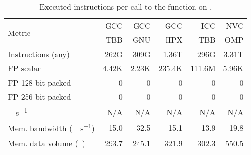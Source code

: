 \begin{table}[t]
	\centering
	\caption{Executed instructions per call to the function \groupsort on \machhydralong.}
	\label{tab:reduce-hw-counters}
	\begin{adjustbox}{max width=\linewidth}
	\begin{tabular}{lrrrrr}
		\toprule
		\multirow{2}{*}{Metric}                       & GCC   & GCC   & GCC    & ICC    & NVC   \\
		                                              & TBB   & GNU   & HPX    & TBB    & OMP   \\
		\midrule
		Instructions (any)                            & 262G  & 309G  & 1.36T  & 296G   & 3.31T \\
		FP scalar                                     & 4.42K & 2.23K & 235.4K & 111.6M & 5.96K \\
		FP 128-bit packed                             & 0     & 0     & 0      & 0      & 0     \\
		FP 256-bit packed                             & 0     & 0     & 0      & 0      & 0     \\
		\unit{\giga\FLOP\per\second}                  & N/A   & N/A   & N/A    & N/A    & N/A   \\
		Mem. bandwidth (\unit{\gibi\byte\per\second}) & 15.0  & 32.5  & 15.1   & 13.9   & 19.8  \\
		Mem. data volume (\unit{\gibi\byte})          & 293.7 & 245.1 & 321.9  & 302.3  & 550.5 \\
		\bottomrule
	\end{tabular}
	\end{adjustbox}
\end{table}


